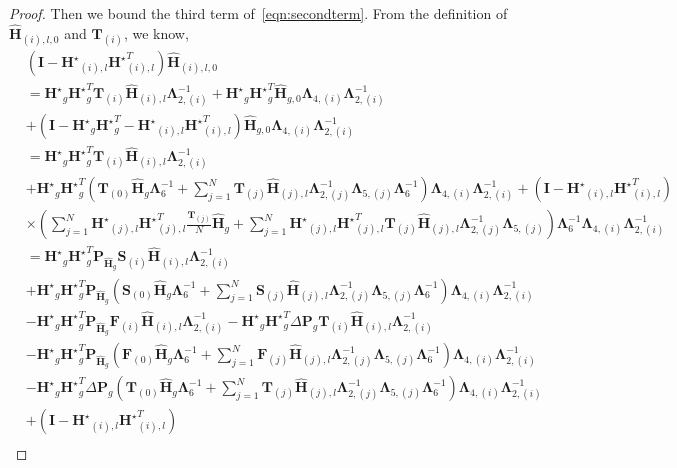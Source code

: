 \documentclass[twoside,11pt]{article}
\newcommand{\matF}{\mathbf{F}}
\newcommand{\hmatH}{{\hat{\mathbf{H}}}{}}
\newcommand{\matHst}{{\mathbf{H}^\star}}
\newcommand{\matI}{\mathbf{I}}
\newcommand{\matP}{\mathbf{P}}
\newcommand{\matT}{\mathbf{T}}
\newcommand{\matLambda}{\mathbf{\Lambda}}
\newcommand{\matS}{\mathbf{S}}
\begin{document}
\begin{proof}
Then we bound the third term of~\eqref{eqn:secondterm}. From the definition of $\hmatH_{(i),l,0}$ and $\matT_{(i)}$, we know,
\begin{align*}
&\left(\matI-\matHst_{(i),l}\matHst_{(i),l}^T\right)\hmatH_{(i),l,0}\\
&=\matHst_g\matHst_g^T\matT_{(i)}\hmatH_{(i),l}\matLambda_{2,(i)}^{-1}+\matHst_g\matHst_g^T\hmatH_{g,0}\matLambda_{4,(i)}\matLambda_{2,(i)}^{-1}\\
&+\left(\matI-\matHst_g\matHst_g^T-\matHst_{(i),l}\matHst_{(i),l}^T\right)\hmatH_{g,0}\matLambda_{4,(i)}\matLambda_{2,(i)}^{-1}\\
&=\matHst_g\matHst_g^T\matT_{(i)}\hmatH_{(i),l}\matLambda_{2,(i)}^{-1}\\
&+\matHst_g\matHst_g^T\left(\matT_{(0)}\hmatH_{g}\matLambda_{6}^{-1}+\sum_{j=1}^N\matT_{(j)}\hmatH_{(j),l} \matLambda_{2,(j)}^{-1} \matLambda_{5,(j)}\matLambda_{6}^{-1}\right)\matLambda_{4,(i)}\matLambda_{2,(i)}^{-1}+\left(\matI-\matHst_{(i),l}\matHst_{(i),l}^T\right)\\
&\times\left(\sum_{j=1}^N\matHst_{(j),l}\matHst_{(j),l}^T\frac{\matT_{(j)}}{N}\hmatH_{g}+\sum_{j=1}^N\matHst_{(j),l}\matHst_{(j),l}^T\matT_{(j)}\hmatH_{(j),l} \matLambda_{2,(j)}^{-1} \matLambda_{5,(j)}\right)\matLambda_{6}^{-1}\matLambda_{4,(i)}\matLambda_{2,(i)}^{-1}\\
&=\matHst_g\matHst_g^T\matP_{\hmatH_g}\matS_{(i)}\hmatH_{(i),l}\matLambda_{2,(i)}^{-1}\\
&+\matHst_g\matHst_g^T\matP_{\hmatH_g}\left(\matS_{(0)}\hmatH_{g}\matLambda_{6}^{-1}+\sum_{j=1}^N\matS_{(j)}\hmatH_{(j),l} \matLambda_{2,(j)}^{-1} \matLambda_{5,(j)}\matLambda_{6}^{-1}\right)\matLambda_{4,(i)}\matLambda_{2,(i)}^{-1}\\
&-\matHst_g\matHst_g^T\matP_{\hmatH_g}\matF_{(i)}\hmatH_{(i),l}\matLambda_{2,(i)}^{-1}-\matHst_g\matHst_g^T\Delta\matP_g\matT_{(i)}\hmatH_{(i),l}\matLambda_{2,(i)}^{-1}\\
&-\matHst_g\matHst_g^T\matP_{\hmatH_g}\left(\matF_{(0)}\hmatH_{g}\matLambda_{6}^{-1}+\sum_{j=1}^N\matF_{(j)}\hmatH_{(j),l} \matLambda_{2,(j)}^{-1} \matLambda_{5,(j)}\matLambda_{6}^{-1}\right)\matLambda_{4,(i)}\matLambda_{2,(i)}^{-1}\\
&-\matHst_g\matHst_g^T\Delta\matP_g\left(\matT_{(0)}\hmatH_{g}\matLambda_{6}^{-1}+\sum_{j=1}^N\matT_{(j)}\hmatH_{(j),l} \matLambda_{2,(j)}^{-1} \matLambda_{5,(j)}\matLambda_{6}^{-1}\right)\matLambda_{4,(i)}\matLambda_{2,(i)}^{-1}\\
&+\left(\matI-\matHst_{(i),l}\matHst_{(i),l}^T\right)\\

\end{align*}
\end{proof}
\end{document}
